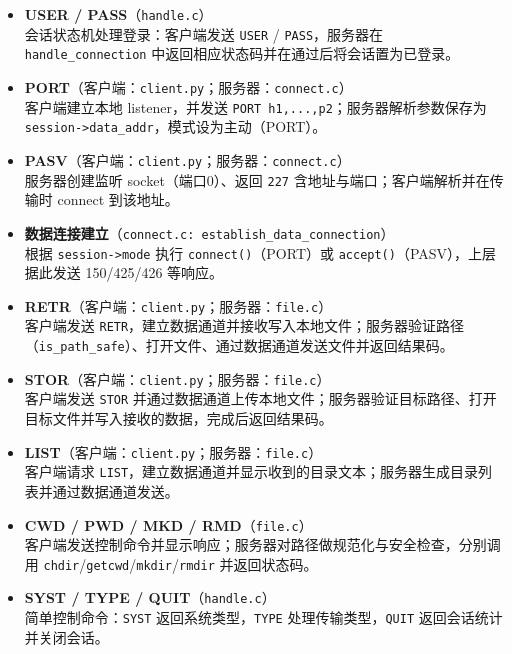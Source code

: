 \documentclass[a4paper,10pt]{article} %
\begin{document}
\begin{itemize}
    \item \textbf{USER / PASS}（\verb|handle.c|）\\
    会话状态机处理登录：客户端发送 \verb|USER| / \verb|PASS|，服务器在 \verb|handle_connection| 中返回相应状态码并在通过后将会话置为已登录。

    \item \textbf{PORT}（客户端：\verb|client.py|；服务器：\verb|connect.c|）\\
    客户端建立本地 listener，并发送 \verb|PORT h1,...,p2|；服务器解析参数保存为 \verb|session->data_addr|，模式设为主动（PORT）。

    \item \textbf{PASV}（客户端：\verb|client.py|；服务器：\verb|connect.c|）\\
    服务器创建监听 socket（端口0）、返回 \verb|227| 含地址与端口；客户端解析并在传输时 connect 到该地址。

    \item \textbf{数据连接建立}（\verb|connect.c: establish_data_connection|）\\
    根据 \verb|session->mode| 执行 \verb|connect()|（PORT）或 \verb|accept()|（PASV），上层据此发送 150/425/426 等响应。

    \item \textbf{RETR}（客户端：\verb|client.py|；服务器：\verb|file.c|）\\
    客户端发送 \verb|RETR|，建立数据通道并接收写入本地文件；服务器验证路径（\verb|is_path_safe|）、打开文件、通过数据通道发送文件并返回结果码。

    \item \textbf{STOR}（客户端：\verb|client.py|；服务器：\verb|file.c|）\\
    客户端发送 \verb|STOR| 并通过数据通道上传本地文件；服务器验证目标路径、打开目标文件并写入接收的数据，完成后返回结果码。

    \item \textbf{LIST}（客户端：\verb|client.py|；服务器：\verb|file.c|）\\
    客户端请求 \verb|LIST|，建立数据通道并显示收到的目录文本；服务器生成目录列表并通过数据通道发送。

    \item \textbf{CWD / PWD / MKD / RMD}（\verb|file.c|）\\
    客户端发送控制命令并显示响应；服务器对路径做规范化与安全检查，分别调用 \verb|chdir|/\verb|getcwd|/\verb|mkdir|/\verb|rmdir| 并返回状态码。

    \item \textbf{SYST / TYPE / QUIT}（\verb|handle.c|）\\
    简单控制命令：\verb|SYST| 返回系统类型，\verb|TYPE| 处理传输类型，\verb|QUIT| 返回会话统计并关闭会话。

\end{itemize}
\end{document}
